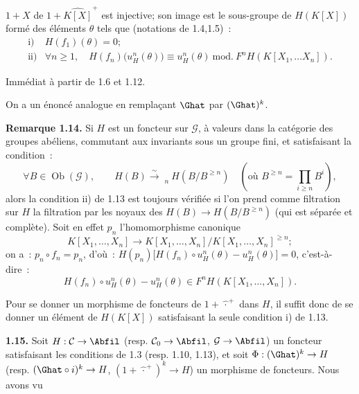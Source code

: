 \(1+X\) de \(1+\widehat{K[X]}^+\) est
injective; son image est le sous-groupe de \(H(K[X])\) formé des éléments \(\theta\) tels que (notations de 1.4,1.5)~:
\[
\begin{array}{ll}
\text{i)}& H(f_1)(\theta)=0;\\[0.3em]
\text{ii)}& \forall n\geq1,\quad
H(f_n)\bigl(u_H^n(\theta)\bigr)\equiv u_H^n(\theta)
\ \mathrm{mod.}\ F^nH(K[X_1,\ldots X_n]).
\end{array}
\]

Immédiat à partir de 1.6 et 1.12.

On a un énoncé analogue en remplaçant \(\Ghat\) par \((\Ghat)^k\).

\textbf{Remarque 1.14.} Si \(H\) est un foncteur sur \(\mathcal G\), à valeurs dans la catégorie des groupes abéliens, commutant aux invariants sous un groupe fini, et satisfaisant la condition~:
\[
  \forall B\in\operatorname{Ob}(\mathcal G),\qquad
  H(B)\xrightarrow{\sim}\mathop{\underleftarrow{\mathrm{Lim}}}\limits_n H(B/B^{\geq n})\quad(\text{où }B^{\geq n}=\prod_{i\geq n}B^i),
\]
alors la condition ii) de 1.13 est toujours vérifiée si l'on prend comme filtration sur \(H\) la filtration par les noyaux des \(H(B)\longrightarrow H(B/B^{\geq n})\) (qui est séparée et complète). Soit en effet \(p_n\) l'homomorphisme canonique
\[
  K[X_1,\ldots,X_n]\longrightarrow K[X_1,\ldots,X_n]/K[X_1,\ldots,X_n]^{\geq n};
\]
on a~: \(p_n\circ f_n=p_n\), d'où~: \(H(p_n)\bigl[H(f_n)\circ u_H^n(\theta)-u_H^n(\theta)\bigr]=0\), c'est-à-dire~:
\[
  H(f_n)\circ u_H^n(\theta)-u_H^n(\theta)
  \in F^nH(K[X_1,\ldots,X_n]).
\]

Pour se donner un morphisme de foncteurs de \(1+\widehat{\,\cdot\,}^{+}\) dans \(H\), il suffit donc de se donner un élément de \(H(K[X])\) satisfaisant la seule condition i) de 1.13.

\textbf{1.15.} Soit \(H:\mathcal C\to\Abfil\) (resp. \(\mathcal C_0\to\Abfil\), \(\mathcal G\to\Abfil\)) un foncteur satisfaisant les conditions de 1.3 (resp. 1.10, 1.13), et soit \(\Phi:(\Ghat)^k\to H\) (resp. \((\Ghat\circ i)^k\to H\), \((1+\widehat{\,\cdot\,}^{+})^k\to H\)) un morphisme de foncteurs. Nous avons vu 
